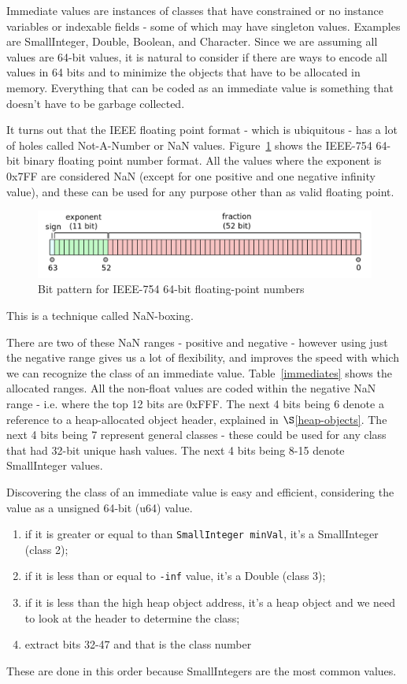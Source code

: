 \documentclass[
]{ceurart}
\def\secref{$\S$\ref}
\def\Figref{Figure~\ref}
\def\Tabref{Table~\ref}
\begin{document}
Immediate values are instances of classes that have constrained or no instance variables or indexable fields - some of which may have singleton values.
Examples are SmallInteger, Double, Boolean, and Character.
Since we are assuming all values are 64-bit values, it is natural to consider if there are ways to encode all values in 64 bits and to minimize the objects that have to be allocated in memory.
Everything that can be coded as an immediate value is something that doesn't have to be garbage collected.

It turns out that the IEEE floating point format - which is ubiquitous - has a lot of holes called Not-A-Number or NaN values.
\Figref{IEEE-fp} shows the IEEE-754\cite{ieee-754} 64-bit binary floating point number format.
All the values where the exponent is 0x7FF are considered NaN (except for one positive and one negative infinity value), and these can be used for any purpose other than as valid floating point.
\begin{figure}[htbp]\label{IEEE-fp}
  \caption{Bit pattern for IEEE-754 64-bit floating-point numbers}
  \includegraphics[width=15cm]{IEEE.png}
\end{figure}
This is a technique called NaN-boxing\cite{nan-boxing-duperas,nan-boxing-nystrom}.

There are two of these NaN ranges - positive and negative - however using just the negative range gives us a lot of flexibility, and improves the speed with which we can recognize the class of an immediate value.
\Tabref{immediates} shows the allocated ranges.
All the non-float values are coded within the negative NaN range - i.e. where the top 12 bits are 0xFFF.
The next 4 bits being 6 denote a reference to a heap-allocated object header, explained in \secref{heap-objects}.  
The next 4 bits being 7 represent general classes - these could be used for any class that had 32-bit unique hash values.
The next 4 bits being 8-15 denote SmallInteger values.

Discovering the class of an immediate value is easy and efficient, considering the value as a unsigned 64-bit (u64) value.
\begin{enumerate}
\item if it is greater or equal to than \verb|SmallInteger minVal|, it's a SmallInteger (class 2);
\item if it is less than or equal to \verb|-inf| value, it's a Double (class 3);
\item if it is less than the high heap object address, it's a heap object and we need to look at the header to determine the class;
\item extract bits 32-47 and that is the class number
\end{enumerate}
These are done in this order because SmallIntegers are the most common values.
\end{document}
